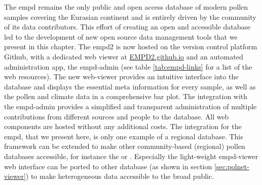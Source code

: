 \documentclass[
11pt, %
english, %
singlespacing, %
headsepline, %
]{MastersDoctoralThesis} %
\begin{document}
\begin{NoHyper}
\begin{refsection}
The \gls{empd} remains the only public and open access database of modern pollen samples covering the Eurasian continent and is entirely driven by the community of its data contributors. This effort of creating an open and accessible database led to the development of new open source data management tools that we present in this chapter. The \gls{empd}2 is now hosted on the version control platform Github, with a dedicated web viewer at \href{https://EMPD2.github.io}{EMPD2.github.io} and an automated administration app, the \gls{empd}-admin (see table \ref{tab:empd-links} for a list of the web resources). The new web-viewer provides an intuitive interface into the database and displays the essential meta information for every sample, as well as the pollen and climate data in a comprehensive bar plot. The integration with the \gls{empd}-admin provides a simplified and transparent administration of multiple contributions from different sources and people to the database. All web components are hosted without any additional costs. The integration for the \gls{empd}, that we present here, is only one example of a regional database. This framework can be extended to make other community-based (regional) pollen databases accessible, for instance the  \citep{FlantuaHooghiemstraGrimmEtAl2015} or  \citep{VincensLezineBuchetEtAl2007}. Especially the light-weight \gls{empd}-viewer web interface can be ported to other database (as shown in section \ref{sec:polnet-viewer}) to make heterogeneous data accessible to the broad public.


\end{refsection}
\end{NoHyper}
\end{document}
